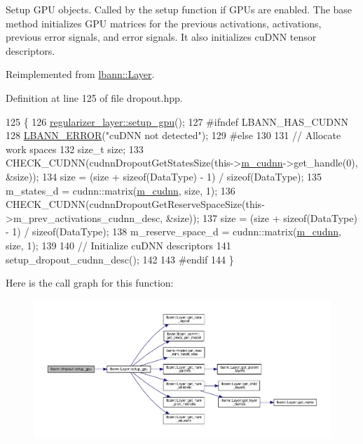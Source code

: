 Setup G\+PU objects. Called by the setup function if G\+P\+Us are enabled. The base method initializes G\+PU matrices for the previous activations, activations, previous error signals, and error signals. It also initializes cu\+D\+NN tensor descriptors. 

Reimplemented from \hyperlink{classlbann_1_1Layer_a36aa22ef90ce4de65abe729d38490863}{lbann\+::\+Layer}.



Definition at line 125 of file dropout.\+hpp.


\begin{DoxyCode}
125                             \{
126     \hyperlink{classlbann_1_1Layer_a36aa22ef90ce4de65abe729d38490863}{regularizer\_layer::setup\_gpu}();
127 \textcolor{preprocessor}{  #ifndef LBANN\_HAS\_CUDNN}
128     \hyperlink{base_8hpp_a80b1d707117e968a6951b7222e4b2b87}{LBANN\_ERROR}(\textcolor{stringliteral}{"cuDNN not detected"});
129 \textcolor{preprocessor}{  #else}
130 
131     \textcolor{comment}{// Allocate work spaces}
132     \textcolor{keywordtype}{size\_t} size;
133     CHECK\_CUDNN(cudnnDropoutGetStatesSize(this->\hyperlink{classlbann_1_1Layer_a08dbb94239e3b8c96329786c57c72e21}{m\_cudnn}->get\_handle(0), &size));
134     size = (size + \textcolor{keyword}{sizeof}(DataType) - 1) / \textcolor{keyword}{sizeof}(DataType);
135     m\_states\_d = cudnn::matrix(\hyperlink{classlbann_1_1Layer_a08dbb94239e3b8c96329786c57c72e21}{m\_cudnn}, size, 1);
136     CHECK\_CUDNN(cudnnDropoutGetReserveSpaceSize(this->m\_prev\_activations\_cudnn\_desc, &size));
137     size = (size + \textcolor{keyword}{sizeof}(DataType) - 1) / \textcolor{keyword}{sizeof}(DataType);
138     m\_reserve\_space\_d = cudnn::matrix(\hyperlink{classlbann_1_1Layer_a08dbb94239e3b8c96329786c57c72e21}{m\_cudnn}, size, 1);
139 
140     \textcolor{comment}{// Initialize cuDNN descriptors}
141     setup\_dropout\_cudnn\_desc();
142     
143 \textcolor{preprocessor}{  #endif}
144   \}
\end{DoxyCode}
Here is the call graph for this function\+:\nopagebreak
\begin{figure}[H]
\begin{center}
\leavevmode
\includegraphics[width=350pt]{classlbann_1_1dropout_abaa3d0c6d99200b186d0a55201f77b6a_cgraph}
\end{center}
\end{figure}
\mbox{\label{classlbann_1_1dropout_abf399d8463721d322aedbb76d60534c6}} 
